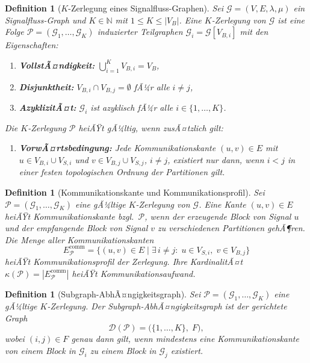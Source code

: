 ﻿\documentclass[12pt,a4paper]{article}
\newtheorem{definition}[theorem]{Definition}
\theoremstyle{definition}
\begin{document}
\begin{definition}[$K$-Zerlegung eines Signalfluss-Graphen]
\label{def:kdecomp}
Sei $\mathcal{G} = (V, E, \lambda, \mu)$ ein Signal\-fluss-Graph und
$K \in \mathbb{N}$ mit $1 \leq K \leq |V_B|$. Eine
\emph{$K$-Zerlegung} von $\mathcal{G}$ ist eine Folge
$\mathcal{P} = (\mathcal{G}_1, \ldots, \mathcal{G}_K)$
induzierter Teilgraphen $\mathcal{G}_i = \mathcal{G}[V_{B,i}]$ mit den
Eigenschaften:
\begin{enumerate}[label=(\alph*)]
  \item \textbf{VollstÃ¤ndigkeit:} $\displaystyle\bigcup_{i=1}^K V_{B,i} = V_B$,
  \item \textbf{Disjunktheit:} $V_{B,i} \cap V_{B,j} = \emptyset$ fÃ¼r alle $i \neq j$,
  \item \textbf{AzyklizitÃ¤t:} $\mathcal{G}_i$ ist azyklisch fÃ¼r alle $i \in \{1,\ldots,K\}$.
\end{enumerate}
Die $K$-Zerlegung $\mathcal{P}$ heiÃŸt \emph{gÃ¼ltig}, wenn zusÃ¤tzlich gilt:
\begin{enumerate}[label=(\alph*), resume]
  \item \textbf{VorwÃ¤rtsbedingung:} Jede Kommunikationskante $(u,v) \in E$
        mit $u \in V_{B,i} \cup V_{S,i}$ und $v \in V_{B,j} \cup V_{S,j}$,
        $i \neq j$, existiert nur dann, wenn $i < j$ in einer festen
        topologischen Ordnung der Partitionen gilt.
\end{enumerate}
\end{definition}

\begin{definition}[Kommunikationskante und Kommunikationsprofil]
\label{def:commEdge}
Sei $\mathcal{P} = (\mathcal{G}_1, \ldots, \mathcal{G}_K)$ eine gÃ¼ltige
$K$-Zerlegung von $\mathcal{G}$. Eine Kante $(u,v) \in E$ heiÃŸt
\emph{Kommunikationskante} bzgl.\ $\mathcal{P}$, wenn der erzeugende
Block von Signal $u$ und der empfangende Block von Signal $v$ zu
verschiedenen Partitionen gehÃ¶ren. Die Menge aller Kommunikationskanten
\[
  E_{\mathcal{P}}^{\mathrm{comm}}
  = \bigl\{(u,v) \in E \;\big|\;
    \exists\, i \neq j :\; u \in V_{S,i},\; v \in V_{B,j}\bigr\}
\]
heiÃŸt \emph{Kommunikationsprofil} der Zerlegung. Ihre KardinalitÃ¤t
$\kappa(\mathcal{P}) = |E_{\mathcal{P}}^{\mathrm{comm}}|$ heiÃŸt
\emph{Kommunikationsaufwand}.
\end{definition}

\begin{definition}[Subgraph-AbhÃ¤ngigkeitsgraph]
\label{def:subdep}
Sei $\mathcal{P} = (\mathcal{G}_1, \ldots, \mathcal{G}_K)$ eine gÃ¼ltige
$K$-Zerlegung. Der \emph{Subgraph-AbhÃ¤ngigkeitsgraph} ist der gerichtete
Graph
\[
  \mathcal{D}(\mathcal{P}) = \bigl(\{1,\ldots,K\},\; F\bigr),
\]
wobei $(i,j) \in F$ genau dann gilt, wenn mindestens eine
Kommunikationskante von einem Block in $\mathcal{G}_i$
zu einem Block in $\mathcal{G}_j$ existiert.
\end{definition}
\end{document}
